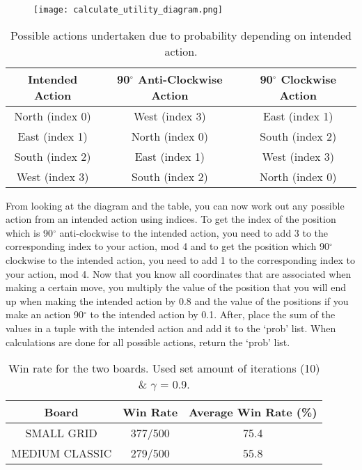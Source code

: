 \documentclass[a4paper]{report}
\begin{document}
        \begin{figure}[H]
          \centering
          \texttt{[image: calculate\_utility\_diagram.png]}
        \end{figure}
        \begin{table}[H]
          \begin{center}
            \begin{tabular}{c|c|c}
              \textbf{Intended Action} & \textbf{90$^{\circ}$ Anti-Clockwise Action} & \textbf{90$^{\circ}$ Clockwise Action}\\
              \hline
              North (index 0) & West (index 3) & East (index 1)\\
              East (index 1) & North (index 0) & South (index 2)\\
              South (index 2) & East (index 1) & West (index 3)\\
              West (index 3) & South (index 2) & North (index 0)\\
            \end{tabular}
            \caption{Possible actions undertaken due to probability depending on intended action.}
            \label{tab:table1}
          \end{center}
        \end{table}
        From looking at the diagram and the table, you can now work out any possible action from an intended action using indices. To get the index of the position which is 90$^{\circ}$ anti-clockwise to the intended action, you need to add 3 to the corresponding index to your action, mod 4 and to get the position which 90$^{\circ}$ clockwise to the intended action, you need to add 1 to the corresponding index to your action, mod 4.
        \newline \newline
        Now that you know all coordinates that are associated when making a certain move, you multiply the value of the position that you will end up when making the intended action by 0.8 and the value of the positions if you make an action 90$^{\circ}$ to the intended action by 0.1. After, place the sum of the values in a tuple with the intended action and add it to the `prob' list. When calculations are done for all possible actions, return the `prob' list.
        \begin{table}[H]
          \begin{center}
            \begin{tabular}{c|c|c}
              \textbf{Board} & \textbf{Win Rate} & \textbf{Average Win Rate (\%)} \\
              \hline
              SMALL GRID & 377/500 & 75.4\\
              MEDIUM CLASSIC & 279/500 & 55.8\\
            \end{tabular}
            \caption{Win rate for the two boards. Used set amount of iterations (10) \& $\gamma$ = 0.9.}
            \label{tab:table2}
          \end{center}
        \end{table}
\end{document}
